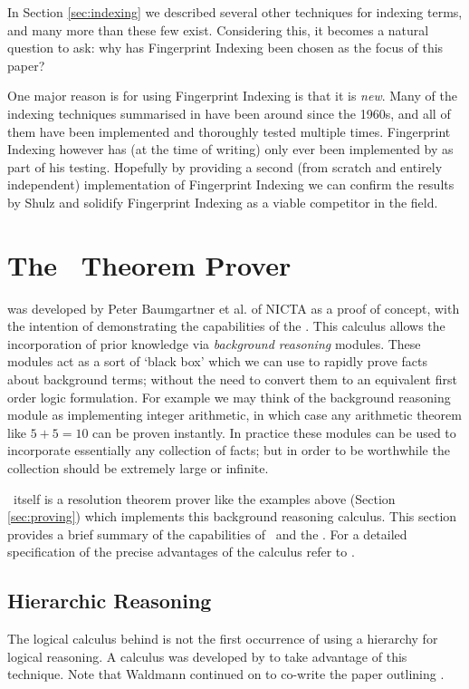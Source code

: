 In Section \ref{sec:indexing} we described several other techniques for indexing
terms, and many more than these few exist. Considering this, it becomes a natural question to ask:
why has Fingerprint Indexing been chosen as the focus of this paper?

One major reason is for using Fingerprint Indexing is that it is \emph{new}. Many of the indexing
techniques summarised in \cite{indexing} have been around since the 1960s, and all of
them have been implemented and thoroughly tested multiple times. Fingerprint
Indexing however has (at the time of writing) only ever been implemented by 
as part of his testing. Hopefully by providing a second (from scratch and entirely independent)
implementation of Fingerprint Indexing we can confirm the results by Shulz and
solidify Fingerprint Indexing as a viable competitor in the field.

\section{The \Beagle\ Theorem Prover}
\label{sec:beagle}

{\Beagle} was developed by Peter Baumgartner et al. of NICTA as a proof of concept,
with the intention of demonstrating the capabilities of the \emph{\HSWAC} \cite{baum13}. This
calculus allows the incorporation of prior knowledge via \emph{background reasoning} modules. 
These modules act as a sort of `black box' which we can use to rapidly prove
facts about background terms; without the need to convert them to an equivalent first order logic
formulation. For example we may think of the background reasoning module
as implementing integer arithmetic, in which case any arithmetic theorem like $5+5=10$ can be proven instantly.
In practice these modules can be used to
incorporate essentially any collection of facts; but in order to be worthwhile
the collection should be extremely large or infinite.

\Beagle\ itself is a resolution theorem prover like the examples above (Section \ref{sec:proving})
which implements this background reasoning calculus. This section provides a brief
summary of the capabilities of \beagle\ and the \HSWAC. For a detailed specification
of the precise advantages of the calculus refer to \cite{baum13}.

\subsection{Hierarchic Reasoning}
\label{sec:hier}
The logical calculus behind {\beagle} is not the first occurrence of using a hierarchy for
logical reasoning. A calculus was developed by  to take advantage
of this technique. Note that Waldmann continued on to co-write the paper outlining
{\HSWA} \cite{baum13}.

